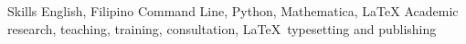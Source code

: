 
\begin{rubric}{Skills}
\entry*[Languages]
	English, Filipino
\entry*[Coding]
	Command Line, Python, Mathematica, \LaTeX
\entry*[Misc.]
	Academic research, teaching, training, consultation, \LaTeX\ typesetting and publishing
\end{rubric}